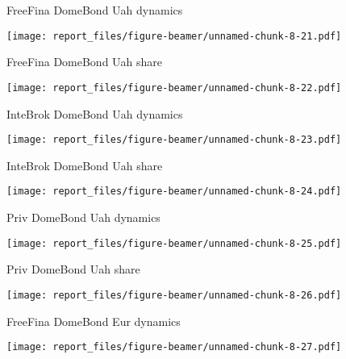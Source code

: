 \documentclass[ignorenonframetext,]{beamer}
\begin{document}
\begin{frame}{FreeFina DomeBond Uah dynamics}
\protect\hypertarget{freefina-domebond-uah-dynamics}{}

\texttt{[image: report\_files/figure-beamer/unnamed-chunk-8-21.pdf]}

\end{frame}

\begin{frame}{FreeFina DomeBond Uah share}
\protect\hypertarget{freefina-domebond-uah-share}{}

\texttt{[image: report\_files/figure-beamer/unnamed-chunk-8-22.pdf]}

\end{frame}

\begin{frame}{InteBrok DomeBond Uah dynamics}
\protect\hypertarget{intebrok-domebond-uah-dynamics}{}

\texttt{[image: report\_files/figure-beamer/unnamed-chunk-8-23.pdf]}

\end{frame}

\begin{frame}{InteBrok DomeBond Uah share}
\protect\hypertarget{intebrok-domebond-uah-share}{}

\texttt{[image: report\_files/figure-beamer/unnamed-chunk-8-24.pdf]}

\end{frame}

\begin{frame}{Priv DomeBond Uah dynamics}
\protect\hypertarget{priv-domebond-uah-dynamics}{}

\texttt{[image: report\_files/figure-beamer/unnamed-chunk-8-25.pdf]}

\end{frame}

\begin{frame}{Priv DomeBond Uah share}
\protect\hypertarget{priv-domebond-uah-share}{}

\texttt{[image: report\_files/figure-beamer/unnamed-chunk-8-26.pdf]}

\end{frame}

\begin{frame}{FreeFina DomeBond Eur dynamics}
\protect\hypertarget{freefina-domebond-eur-dynamics}{}

\texttt{[image: report\_files/figure-beamer/unnamed-chunk-8-27.pdf]}

\end{frame}
\end{document}
